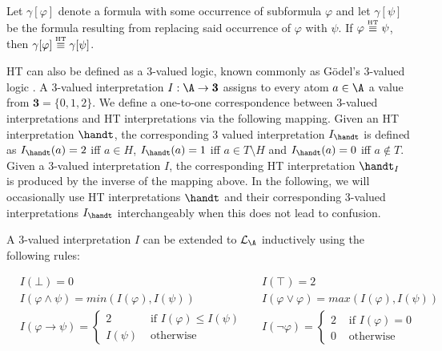 \begin{proposition}
  Let $\gamma[\varphi]$ denote a formula with some occurrence of
  subformula $\varphi$ and let $\gamma[\psi]$ be the formula resulting
  from replacing said occurrence of $\varphi$ with $\psi$. If
  $\varphi \stackrel{\normalfont\mbox{\tiny HT}}{\equiv} \psi$, then $\gamma[\varphi] \stackrel{\normalfont\mbox{\tiny HT}}{\equiv} \gamma[\psi]$.
\end{proposition}

HT can also be defined as a 3-valued logic, known commonly as Gödel's
3-valued logic \cite{capeva05a}. A 3-valued interpretation
$I: \A \rightarrow \textbf{3}$ assigns to every atom $a\in \A$ a value
from $\textbf{3}=\{ 0, 1, 2 \}$. We define a one-to-one correspondence
between 3-valued interpretations and HT interpretations via the
following mapping. Given an HT interpretation $\handt$, the
corresponding 3 valued interpretation $I_{\handt}$ is defined as
$I_{\handt}(a)=2$ iff $a \in H$, $I_{\handt}(a)=1$ iff
$a \in T \setminus H$ and $I_{\handt}(a)=0$ iff $a \not\in T$. Given a
3-valued interpretation $I$, the corresponding HT interpretation
$\handt_{I}$ is produced by the inverse of the mapping above. In the
following, we will occasionally use HT interpretations $\handt$ and
their corresponding 3-valued interpretations $I_{\handt}$
interchangeably when this does not lead to confusion.

A 3-valued interpretation $I$ can be extended to $\langa$
inductively using the following rules:
\begin{definition}\label{def:3-valued-extension}
  \begin{align*}
    &I(\bot) = 0
    &&I(\top) = 2 \\
    &I(\varphi \wedge \psi) = min(I(\varphi),I(\psi)) 
    &&I(\varphi \vee \varphi) = max(I(\varphi),I(\psi)) \\
    &I(\varphi \rightarrow \psi) = 
      \begin{cases}
        2 & \text { if } I(\varphi) \leq I(\psi) \\
        I(\psi) & \text { otherwise }
      \end{cases}
    &&I(\neg \varphi) = \begin{cases}2 
      & \text { if } I(\varphi)=0 \\ 
      0 & \text { otherwise }\end{cases}
  \end{align*}
\end{definition}

